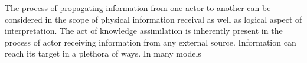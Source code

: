 The process of propagating information from one actor to another can be considered in the scope of physical information receival as well as logical aspect of interpretation.
The act of knowledge assimilation is inherently present in the process of actor receiving information from any external source.
Information can reach its target in a plethora of ways.
In many models
